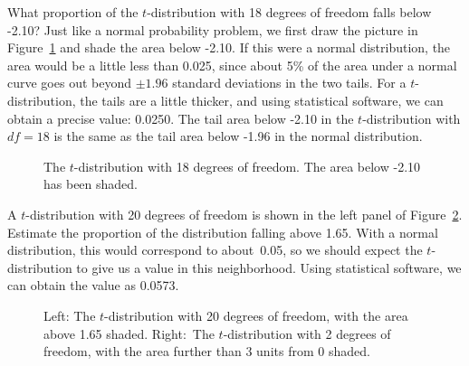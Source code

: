 \begin{examplewrap}
\begin{nexample}{What proportion of the $t$-distribution
    with 18 degrees of freedom falls below -2.10?}
  Just like a normal probability problem, we first draw
  the picture in Figure~\ref{tDistDF18LeftTail2Point10}
  and shade the area below -2.10.
  If this were a normal distribution, the area would be
  a little less than 0.025, since about 5\% of the area
  under a normal curve goes out beyond $\pm 1.96$ standard
  deviations in the two tails.
  For a $t$-distribution, the tails are a little thicker,
  and using statistical software, we can obtain a precise
  value: 0.0250.
  The tail area below -2.10 in the $t$-distribution with
  $df = 18$ is the same as the tail area below -1.96 in
  the normal distribution.
\end{nexample}
\end{examplewrap}

\begin{figure}
  \centering
  \caption{The $t$-distribution with 18 degrees of freedom.
      The area below -2.10 has been shaded.}
  \label{tDistDF18LeftTail2Point10}
\end{figure}

\begin{examplewrap}
\begin{nexample}{A $t$-distribution with 20 degrees of freedom
    is shown in the left panel of
    Figure~\ref{tDistDF20RightTail1Point65}.
    Estimate the proportion of the distribution falling
    above 1.65.}
  With a normal distribution, this would correspond to
  about~0.05, so we should expect the $t$-distribution
  to give us a value in this neighborhood.
  Using statistical software, we can obtain the value
  as 0.0573.
\end{nexample}
\end{examplewrap}

\begin{figure}
  \centering
  \caption{Left: The $t$-distribution with 20 degrees
      of freedom, with the area above 1.65 shaded.
      Right:~The $t$-distribution with 2 degrees of freedom,
      with the area further than 3 units from 0 shaded.}
  \label{tDistDF20RightTail1Point65}
\end{figure}

